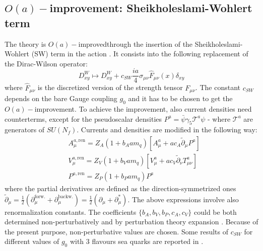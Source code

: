 \documentclass[english, LaM, oneside, noexaminfo]{sapthesis}
\newcommand{\ren}{{\text{ren}}}
\newcommand{\oaid}{$O(a)-$improved}
\newcommand{\oait}{$O(a)-$improvement}
\begin{document}
\subsection{\oait: Sheikholeslami-Wohlert term}\label{subsec:SWterm}
\noindent
The theory is \oaid\space through the insertion of the Sheikholeslami-Wohlert (SW) term in the action \cite{SWterm-Sommer}.
It consists into the following replacement of the Dirac-Wilson operator:
\begin{equation}\label{eq:sw-term}
    D^W_{xy} \longmapsto D^W_{xy} + c_{SW} \frac{ia}{4}\sigma_{\mu\nu}\hat F_{\mu\nu} (x) \delta_{xy}
\end{equation}
where $\hat F_{\mu\nu}$ is the discretized version of the strength tensor $F_{\mu\nu}$.
The constant $c_{SW}$ depends on the bare Gauge coupling $g_0$ and it has to be chosen to get the $O(a)-$improvement.
To achieve the improvement, also current densities need counterterms, except for the pseudoscalar densities $P^a = \bar \psi \gamma_5 \mathcal{T}^a \psi$ - where $\mathcal{T}^a$ are generators of $SU(N_f)$.
Currents and densities are modified in the following way:
\begin{equation*}
    \begin{aligned}
        & A_\mu^{a,\ren} = Z_A (1+b_A a m_q) \left[ A_\mu^a + ac_A \tilde{\partial}_\mu P^a \right] \\
        & V_\mu^{a,\ren} = Z_V (1+b_V a m_q) \left[ V_\mu^a + ac_V \tilde{\partial}_\nu T^a_{\mu\nu} \right] \\
        & P^{a,\ren} = Z_P (1+b_P a m_q) P^a
    \end{aligned}
\end{equation*}
where the partial derivatives are defined as the direction-symmetrized ones $\tilde{\partial}_\mu = \frac{1}{2}(\partial_\mu^\text{forw.} + \partial_\mu^\text{backw.})=\frac{1}{2}(\partial_\mu + \partial_\mu^*)$.
The above expressions involve also renormalization constants.
The coefficients $\{ b_A, b_V, b_P, c_A, c_V \}$ could be both determined non-perturbatively and by perturbation theory expansion \cite{SWterm-Sommer}.
Because of the present purpose, non-perturbative values are chosen.
Some results of $c_{SW}$ for different values of $g_0$ with 3 flavours sea quarks are reported in \cite{cSW-non-perturbative}.
\end{document}

